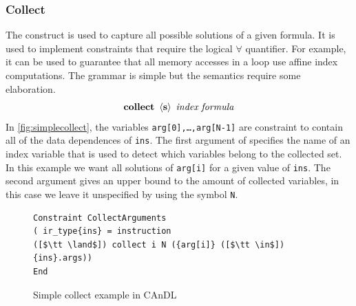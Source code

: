 \begin{figure}[ht]

\label{fig:inheritsandrenameandrebase}
\end{figure}

\subsubsection{Collect}

    The  construct is used to capture all possible solutions
    of a given formula.
    It is used to implement constraints that require the logical $\forall$
    quantifier.
    For example, it can be used to guarantee that all memory accesses in a loop
    use affine index computations.
    The grammar is simple but the semantics require some elaboration.
    \begin{align*}
        \text{\bf collect}\ \left<\text{\bf s}\right>\ \text{\it index}\ \text{\it formula}
    \end{align*}
    In \autoref{fig:simplecollect}, the variables \texttt{arg[0],\dots,arg[N-1]}
    are constraint to contain all of the data dependences of \texttt{ins}.
    The first argument of  specifies the name of an index
    variable that is used to detect which variables belong to the collected set.
    In this example we want all solutions of \texttt{arg[i]} for a given value
    of \texttt{ins}.
    The second argument gives an upper bound to the amount of collected
    variables, in this case we leave it unspecified by using the symbol
    \texttt{N}.

\begin{figure}[ht]
\begin{lstlisting}[language=CAnDL]
Constraint CollectArguments
( ir_type{ins} = instruction
([$\tt \land$]) collect i N ({arg[i]} ([$\tt \in$]) {ins}.args))
End
\end{lstlisting}
\vspace{-0.3cm}
\caption{Simple collect example in CAnDL}
\label{fig:simplecollect}
\end{figure}

